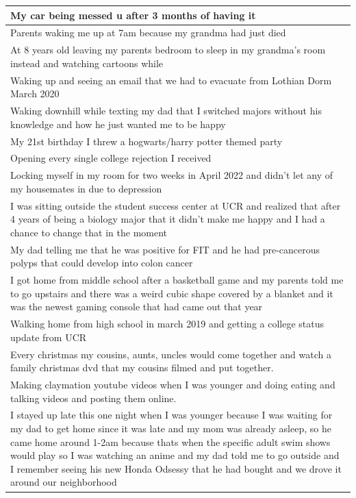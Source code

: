 \documentclass[
  .7em,
  letterpaper,
  DIV=11,
  numbers=noendperiod]{scrartcl}
\begin{document}
\begin{table}
\begin{tabular}{l}
\hline
My car being messed u after 3 months of having it\\
\hline
Parents waking me up at 7am because my grandma had just died\\
\hline
At 8 years old leaving my parents bedroom to sleep in my grandma's room instead and watching cartoons while\\
\hline
Waking up and seeing an email that we had to evacuate from Lothian Dorm March 2020\\
\hline
Waking downhill while texting my dad that I switched majors without his knowledge and how he just wanted me to be happy\\
\hline
My 21st birthday I threw a hogwarts/harry potter themed party\\
\hline
Opening every single college rejection I received\\
\hline
Locking myself in my room for two weeks in April 2022 and didn't let any of my housemates in due to depression\\
\hline
I was sitting outside the student success center at UCR and realized that after 4 years of being a biology major that it didn't make me happy and I had a chance to change that in the moment\\
\hline
My dad telling me that he was positive for FIT and he had pre-cancerous polyps that could develop into colon cancer\\
\hline
I got home from middle school after a basketball game and my parents told me to go upstairs and there was a weird cubic shape covered by a blanket and it was the newest gaming console that had came out that year\\
\hline
Walking home from high school in march 2019 and getting a college status update from UCR\\
\hline
Every christmas my cousins, aunts, uncles would come together and watch a family christmas dvd that my cousins filmed and put together.\\
\hline
Making claymation youtube videos when I was younger and doing eating and talking videos and posting them online.\\
\hline
I stayed up late this one night when I was younger because I was waiting for my dad to get home since it was late and my mom was already asleep, so he came home around 1-2am because thats when the specific adult swim shows would play so I was watching an anime and my dad told me to go outside and I remember seeing his new Honda Odsessy that he had bought and we drove it around our neighborhood\\

\end{tabular}
\end{table}
\end{document}
